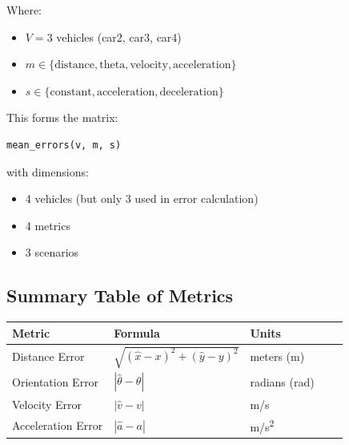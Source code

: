 \documentclass{article}
\begin{document}
Where:

\begin{itemize}
    \item $V = 3$ vehicles (car2, car3, car4)
    \item $m \in \{\text{distance}, \text{theta}, \text{velocity}, \text{acceleration}\}$
    \item $s \in \{\text{constant}, \text{acceleration}, \text{deceleration}\}$
\end{itemize}

This forms the matrix:

\begin{verbatim}
mean_errors(v, m, s)
\end{verbatim}

with dimensions:

\begin{itemize}
    \item 4 vehicles (but only 3 used in error calculation)
    \item 4 metrics
    \item 3 scenarios
\end{itemize}

\subsection*{Summary Table of Metrics}

\begin{tabular}{lllll}
    \toprule
    \textbf{Metric} & \textbf{Formula} & \textbf{Units} & & \\
    \midrule
    Distance Error & $\sqrt{( \hat{x} - x )^2 + ( \hat{y} - y )^2}$ & meters (m) & & \\
    Orientation Error & $| \hat{\theta} - \theta |$ & radians (rad) & & \\
    Velocity Error & $| \hat{v} - v |$ & m/s & & \\
    Acceleration Error & $| \hat{a} - a |$ & m/s\textsuperscript{2} & & \\
    \bottomrule
\end{tabular}
\end{document}
